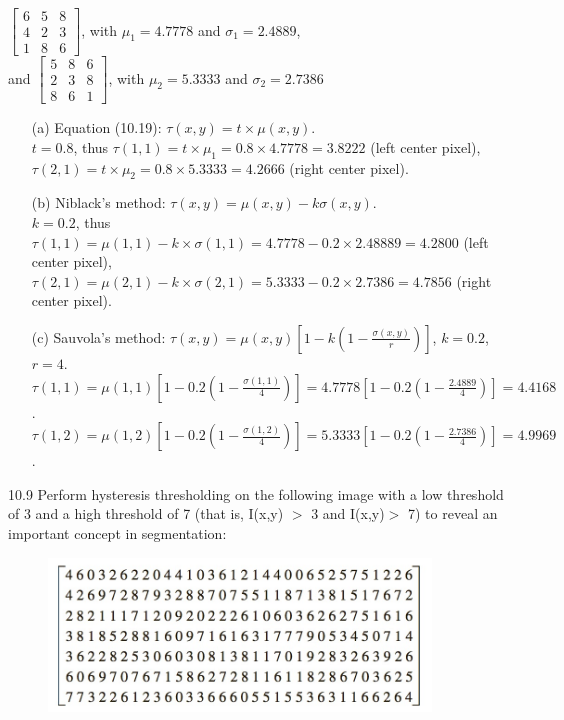 \documentclass[a4paper]{article}
\begin{document}
\begin{spacing}{2.0}
	$\begin{bmatrix}
	6 & 5 & 8\\
	4 & 2 & 3\\
	1 & 8 & 6
	\end{bmatrix}$, with $\mu_1 = 4.7778$ and $\sigma_1 = 2.4889$, \\
	and $\begin{bmatrix}
	5 & 8 & 6\\
	2 & 3 & 8\\
	8 & 6 &1
	\end{bmatrix}$, with $\mu_2 = 5.3333$ and $\sigma_2 = 2.7386$
	\begin{enumerate}
	\item[(a)]Equation (10.19): $\tau(x,y) = t \times \mu(x,y)$.\\
	$t = 0.8$, thus $\tau(1,1) = t\times \mu_1 = 0.8\times 4.7778 = 3.8222$ (left center pixel), $\tau(2,1) = t\times \mu_2 = 0.8\times 5.3333 = 4.2666$ (right center pixel).
	
	\item[(b)]Niblack's method: $\tau(x,y) = \mu(x,y) - k\sigma(x,y)$.\\
	$k = 0.2$, thus $\tau(1,1) = \mu(1,1) - k\times \sigma(1,1) = 4.7778 - 0.2\times 2.48889 = 4.2800$ (left center pixel), $\tau(2,1) = \mu(2,1) - k\times \sigma(2,1) = 5.3333 - 0.2\times 2.7386 = 4.7856$ (right center pixel).
	
	\item[(c)] Sauvola's method: $\tau(x,y) = \mu(x,y)[1-k(1-\displaystyle\frac{\sigma(x,y)}{r})]$, $k = 0.2$, $r = 4$.\\
	$\tau(1,1) = \mu(1,1)[1-0.2(1-\displaystyle\frac{\sigma(1,1)}{4})] = 4.7778[1-0.2(1-\displaystyle\frac{2.4889}{4})] = 4.4168$.\\
	$\tau(1,2) = \mu(1,2)[1-0.2(1-\displaystyle\frac{\sigma(1,2)}{4})] = 5.3333[1-0.2(1-\displaystyle\frac{2.7386}{4})] = 4.9969$.\\
	\end{enumerate}
	
	10.9 Perform hysteresis thresholding on the following image with a low threshold of 3 and a high threshold of 7 (that is, I(x,y) $>$ 3 and I(x,y)$>$ 7) to reveal an important concept in segmentation:
	\begin{figure}[htbp]
	 \includegraphics[width=4in]{p9.jpg}
	\end{figure}


\end{spacing}
\end{document}
